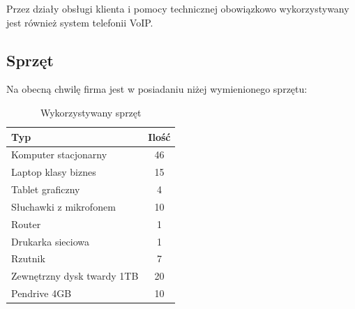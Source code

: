 \documentclass{article}
\begin{document}
        Przez działy obsługi klienta i pomocy technicznej obowiązkowo wykorzystywany jest również system telefonii VoIP.
        \subsection{Sprzęt}
            Na obecną chwilę firma jest w posiadaniu niżej wymienionego sprzętu:
            \begin{table}[H]
                \centering
                \begin{tabular}{ | l | c | }
                    \hline
                    \textbf{Typ} & \textbf{Ilość} \\
                    \hline
                    Komputer stacjonarny & 46 \\
                    \hline
                    Laptop klasy biznes & 15 \\
                    \hline
                    Tablet graficzny & 4 \\
                    \hline
                    Słuchawki z mikrofonem & 10 \\
                    \hline
                    Router & 1 \\
                    \hline
                    Drukarka sieciowa & 1 \\
                    \hline
                    Rzutnik & 7 \\
                    \hline
                    Zewnętrzny dysk twardy 1TB & 20 \\
                    \hline
                    Pendrive 4GB & 10 \\
                    \hline
                \end{tabular}
                \caption{Wykorzystywany sprzęt}
            \end{table}
\end{document}
